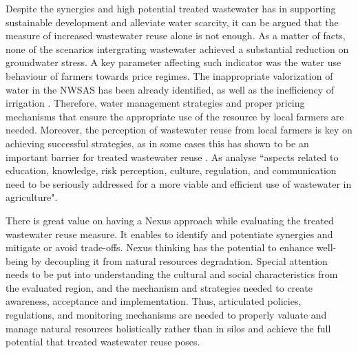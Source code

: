 Despite the synergies and high potential treated wastewater has in supporting sustainable development and alleviate water scarcity, it can be argued that the measure of increased wastewater reuse alone is not enough. As a matter of facts, none of the scenarios intergrating wastewater achieved a substantial reduction on groundwater stress. A key parameter affecting such indicator was the water use behaviour of farmers towards price regimes. The inappropriate valorization of water in the NWSAS has been already identified, as well as the inefficiency of irrigation \cite{BetterValorizationIrrigation2015}. Therefore, water management strategies and proper pricing mechanisms that ensure the appropriate use of the resource by local farmers are needed. Moreover, the perception of wastewater reuse from local farmers is key on achieving successful strategies, as in some cases this has shown to be an important barrier for treated wastewater reuse \cite{mahjoubPublicAcceptanceWastewater2018}. As \citet{mahjoubPublicAcceptanceWastewater2018} analyse ``aspects related to education, knowledge, risk perception, culture, regulation, and communication need to be seriously addressed for a more viable and efficient use of wastewater in agriculture".

There is great value on having a Nexus approach while evaluating the treated wastewater reuse measure. It enables to identify and potentiate synergies and mitigate or avoid trade-offs. Nexus thinking has the potential to enhance well-being by decoupling it from natural resources degradation. Special attention needs to be put into understanding the cultural and social characteristics from the evaluated region, and the mechanism and strategies needed to create awareness, acceptance and implementation. Thus, articulated policies, regulations, and monitoring mechanisms are needed to properly valuate and manage natural resources holistically rather than in silos and achieve the full potential that treated wastewater reuse poses.